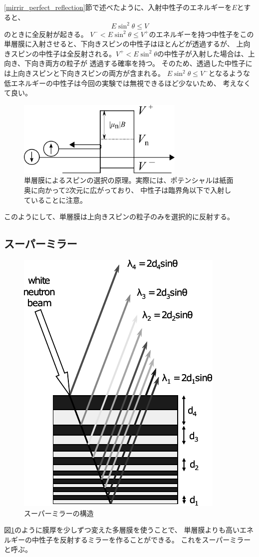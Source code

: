 \ref{mirrir_perfect_reflection}節で述べたように、入射中性子のエネルギーを$E$とすると、
\[
E\sin^2\theta\leq V
\]
のときに全反射が起きる。
$V^-< E\sin^2\theta\leq V^+$のエネルギーを持つ中性子をこの単層膜に入射させると、下向きスピンの中性子はほとんどが透過するが、
上向きスピンの中性子は全反射される。$V^+<E\sin^2\theta$の中性子が入射した場合は、上向き、下向き両方の粒子が
透過する確率を持つ。
そのため、透過した中性子には上向きスピンと下向きスピンの両方が含まれる。
$E\sin^2\theta\leq V^-$となるような低エネルギーの中性子は今回の実験では無視できるほど少ないため、
考えなくて良い。

\begin{figure}[h]
\centering
\includegraphics[width=8cm]{mirror/mono_mirror.pdf}
\caption{単層膜によるスピンの選択の原理。実際には、ポテンシャルは紙面奥に向かって2次元に広がっており、
中性子は臨界角以下で入射していることに注意。}
\end{figure}
このようにして、単層膜は上向きスピンの粒子のみを選択的に反射する。

\subsection{スーパーミラー}
\begin{figure}[H]
\centering
\includegraphics{mirror/super_mirror.pdf}
\caption{スーパーミラーの構造\cite{seki}\label{mirror_super_mirror}}
\end{figure}
図\ref{mirror_super_mirror}のように膜厚を少しずつ変えた多層膜を使うことで、
単層膜よりも高いエネルギーの中性子を反射するミラーを作ることができる。
これをスーパーミラーと呼ぶ。

